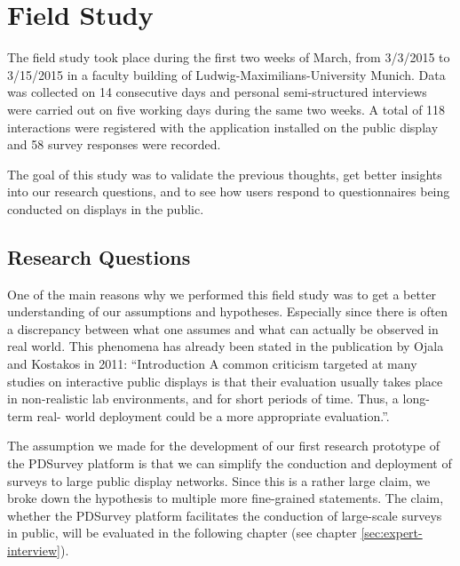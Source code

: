 \section{Field Study}
\label{sec:field-study}


	The field study took place during the first two weeks of March, from 3/3/2015 to 3/15/2015 in a faculty building of Ludwig-Maximilians-University Munich. Data was collected on 14 consecutive days and personal semi-structured interviews were carried out on five working days during the same two weeks. A total of 118 interactions were registered with the application installed on the public display and 58 survey responses were recorded.

	The goal of this study was to validate the previous thoughts, get better insights into our research questions, and to see how users respond to questionnaires being conducted on displays in the public.




\subsection{Research Questions}


	One of the main reasons why we performed this field study was to get a better understanding of our assumptions and hypotheses. Especially since there is often a discrepancy between what one assumes and what can actually be observed in real world. This phenomena has already been stated in the publication by Ojala and Kostakos in 2011: ``Introduction A common criticism targeted at many studies on interactive public displays is that their evaluation usually takes place in non-realistic lab environments, and for short periods of time. Thus, a long-term real- world deployment could be a more appropriate evaluation.''\cite{Ojala2011}.



	The assumption we made for the development of our first research prototype of the PDSurvey platform is that we can simplify the conduction and deployment of surveys to large public display networks. Since this is a rather large claim, we broke down the hypothesis to multiple more fine-grained statements. The claim, whether the PDSurvey platform facilitates the conduction of large-scale surveys in public, will be evaluated in the following chapter (see chapter \ref{sec:expert-interview}). 

